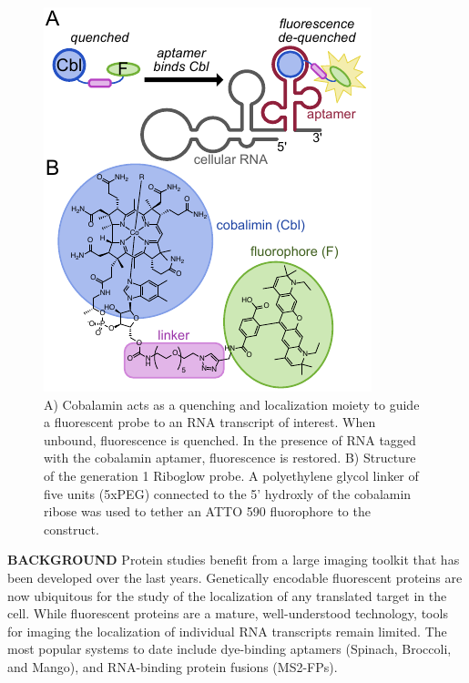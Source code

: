 \begin{figure}
\begin{centering}
\includegraphics[width=\textwidth]{figures/fig1v2.pdf}

\end{centering}
\footnotesize
\caption{\label{figure:riboglow}
A) Cobalamin acts as a quenching and localization moiety to guide a fluorescent probe to an RNA transcript of interest. When unbound, fluorescence is quenched. In the presence of RNA tagged with the cobalamin aptamer, fluorescence is restored. B) Structure of the generation 1 Riboglow probe. A polyethylene glycol linker of five units (5xPEG) connected to the 5' hydroxly of the cobalamin ribose was used to tether an ATTO 590 fluorophore to the construct.
}
\end{figure}

\textbf{BACKGROUND}
Protein studies benefit from a large imaging toolkit that has been developed over the last  years. Genetically encodable fluorescent proteins are now ubiquitous for the study of the localization of any translated target in the cell. While fluorescent proteins are a mature, well-understood technology, tools for imaging the localization of individual RNA transcripts remain limited. The most popular systems to date include dye-binding aptamers (Spinach\cite{PaigeRNAMimicsGreen2011}, Broccoli\cite{FilonovBroccoliRapidSelection2014}, and Mango\cite{AutourFluorogenicRNAMango2018,DolgosheinaRNAMangoAptamerFluorophore2014}), and RNA-binding protein fusions (MS2-FPs).\cite{FuscoSinglemRNAMolecules2003}

